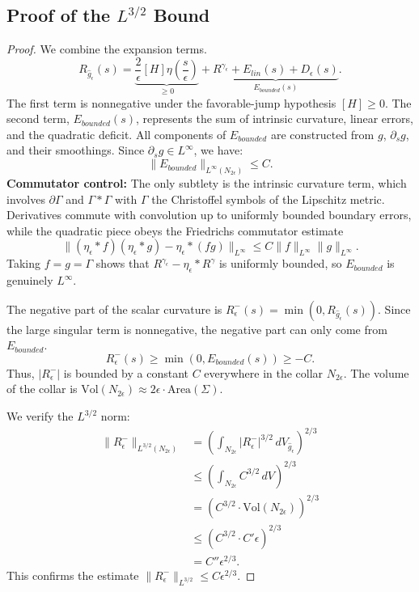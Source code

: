 \subsection{Proof of the \texorpdfstring{$L^{3/2}$}{L(3/2)} Bound}
\begin{proof}
We combine the expansion terms.
\[ R_{\hat{g}_\epsilon}(s) = \underbrace{\frac{2}{\epsilon} [H] \eta\left(\frac{s}{\epsilon}\right)}_{\ge 0} + \underbrace{R^{\gamma_\epsilon} + E_{lin}(s) + D_\epsilon(s)}_{E_{bounded}(s)}. \]
The first term is nonnegative under the favorable-jump hypothesis $[H] \ge 0$. The second term, $E_{bounded}(s)$, represents the sum of intrinsic curvature, linear errors, and the quadratic deficit. All components of $E_{bounded}$ are constructed from $g$, $\partial_s g$, and their smoothings. Since $\partial_s g \in L^\infty$, we have:
\[ \|E_{bounded}\|_{L^\infty(N_{2\epsilon})} \le C. \]
\textbf{Commutator control:} The only subtlety is the intrinsic curvature term, which involves $\partial \Gamma$ and $\Gamma * \Gamma$ with $\Gamma$ the Christoffel symbols of the Lipschitz metric. Derivatives commute with convolution up to uniformly bounded boundary errors, while the quadratic piece obeys the Friedrichs commutator estimate
\[ \| (\eta_\epsilon * f)(\eta_\epsilon * g) - \eta_\epsilon * (fg) \|_{L^\infty} \le C \|f\|_{L^\infty} \|g\|_{L^\infty}. \]
Taking $f=g=\Gamma$ shows that $R^{\gamma_\epsilon} - \eta_\epsilon * R^{\gamma}$ is uniformly bounded, so $E_{bounded}$ is genuinely $L^\infty$.

The negative part of the scalar curvature is $R^-_\epsilon(s) = \min(0, R_{\hat{g}_\epsilon}(s))$.
Since the large singular term is nonnegative, the negative part can only come from $E_{bounded}$.
\[ R^-_\epsilon(s) \ge \min(0, E_{bounded}(s)) \ge -C. \]
Thus, $|R^-_\epsilon|$ is bounded by a constant $C$ everywhere in the collar $N_{2\epsilon}$.
The volume of the collar is $\text{Vol}(N_{2\epsilon}) \approx 2\epsilon \cdot \text{Area}(\Sigma)$.

We verify the $L^{3/2}$ norm:
\begin{align*}
    \|R^-_\epsilon\|_{L^{3/2}(N_{2\epsilon})} &= \left( \int_{N_{2\epsilon}} |R^-_\epsilon|^{3/2} \, dV_{\hat{g}_\epsilon} \right)^{2/3} \\
    &\le \left( \int_{N_{2\epsilon}} C^{3/2} \, dV \right)^{2/3} \\
    &= \left( C^{3/2} \cdot \text{Vol}(N_{2\epsilon}) \right)^{2/3} \\
    &\le \left( C^{3/2} \cdot C' \epsilon \right)^{2/3} \\
    &= C'' \epsilon^{2/3}.
\end{align*}
This confirms the estimate $\|R^-_\epsilon\|_{L^{3/2}} \le C \epsilon^{2/3}$.
\end{proof}


